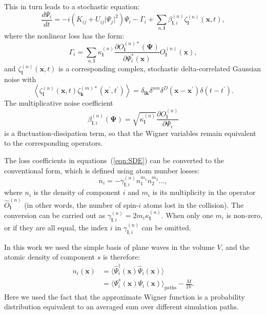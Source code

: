 \documentclass[aps,prl,twocolumn,showpacs,amsmath,amssymb,superscriptaddress,flushbottom,noraggedfooter]{revtex4-1}
\newcommand{\xvec}{\boldsymbol{x}}
\newcommand{\kvec}{\boldsymbol{k}}
\newcommand{\lvec}{\boldsymbol{l}}
\newcommand{\Psivec}{\boldsymbol{\Psi}}
\begin{document}
This in turn leads to a stochastic equation:
\begin{equation}
\label{eqn:SDE}
	\frac{d\Psi_{i}}{dt} =
		- i\left( K_{ij} + U_{ij} \lvert \Psi_{j} \rvert^{2} \right) \Psi_{i}
		- \Gamma_{i}
		+ \sum_{n,\lvec} \beta_{\lvec,i}^{(n)} \zeta_{\lvec}^{(n)}(\xvec,t),
\end{equation}
where the nonlinear loss has the form:
\begin{equation}
	\Gamma_{i} = \sum_{n,\lvec}
		\kappa_{\lvec}^{(n)}
		\frac{\partial O_{\lvec}^{(n)*} (\Psivec)}{\partial\Psi_{i}^{*} (\xvec)}
		O_{\lvec}^{(n)}(\xvec),
\end{equation}
and $\zeta_{\lvec}^{(n)}(\xvec, t)$ is a corresponding complex,
stochastic delta-correlated Gaussian noise with
\begin{equation}
	\left\langle
		\zeta_{\lvec}^{(n)} (\xvec,t) \zeta_{\kvec}^{(m)*}(\xvec^\prime, t^\prime)
	\right\rangle =
	\delta_{\lvec \kvec} \delta^{nm} \delta^{D} \left(
		\xvec - \xvec^\prime
	\right)
	\delta \left( t - t^\prime \right).
\end{equation}
The multiplicative noise coefficient
\begin{equation}
	\beta_{\lvec,i}^{(n)} \left( \Psivec \right) =
	\sqrt{\kappa_{\lvec}^{(n)}}
	\frac{\partial O_{\lvec}^{(n)}}{\partial\Psi_{i}}
\end{equation}
is a fluctuation-dissipation term,
so that the Wigner variables remain equivalent to the corresponding operators.

The loss coefficients in equations~(\ref{eqn:SDE}) can be converted to the conventional form,
which is defined using atom number losses:
\begin{equation}
	\dot{n_i} = - \gamma^{(n)}_{\lvec,i} n^{m_1}_1 n^{m_2}_2 \ldots ,
\end{equation}
where $n_i$ is the density of component $i$ and $m_i$
is its multiplicity in the operator $\hat{O}^{(n)}_{\lvec}$
(in other words, the number of spin-$i$ atoms lost in the collision).
The conversion can be carried out as $\gamma^{(n)}_{\lvec,i} = 2 m_i \kappa^{(n)}_{\lvec}$.
When only one $m_i$ is non-zero, or if they are all equal,
the index $i$ in $\gamma^{(n)}_{\lvec,i}$ can be omitted.

In this work we used the simple basis of plane waves in the volume $V$,
and the atomic density of component $s$ is therefore:
\begin{equation}
\label{eqn:wigner-density}
\begin{split}
	n_i (\xvec) & = \langle \widehat{\Psi}^\dagger_i (\xvec) \widehat{\Psi}_i (\xvec) \rangle \\
		& = \langle \Psi^*_i (\xvec) \Psi_i (\xvec) \rangle_{\mathrm{paths}} - \frac{M}{2V}.
\end{split}
\end{equation}
Here we used the fact that the approximate Wigner function is a probability distribution
equivalent to an averaged sum over different simulation paths.
\end{document}
